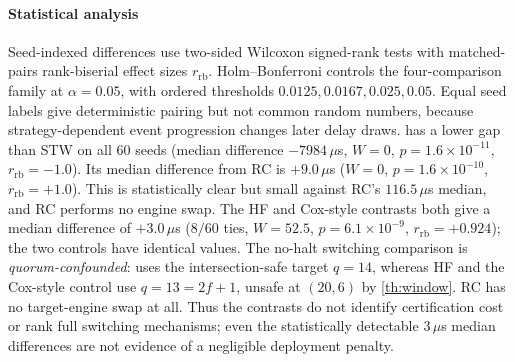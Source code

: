 \begin{table}[t]
\centering
{}
\end{table}

\paragraph{Statistical analysis}
Seed-indexed differences use two-sided Wilcoxon signed-rank tests with matched-pairs rank-biserial
effect sizes $r_{\mathrm{rb}}$. Holm--Bonferroni controls the four-comparison family at $\alpha=0.05$,
with ordered thresholds $0.0125,0.0167,0.025,0.05$. Equal seed labels give deterministic pairing but
not common random numbers, because strategy-dependent event progression changes later delay draws.
\sage{} has a lower gap than STW on all $60$ seeds (median difference $-7984\,\mu$s, $W=0$,
$p=1.6\times10^{-11}$, $r_{\mathrm{rb}}=-1.0$). Its median difference from RC is $+9.0\,\mu$s ($W=0$,
$p=1.6\times10^{-10}$, $r_{\mathrm{rb}}=+1.0$). This is statistically clear but small against RC's
$116.5\,\mu$s median, and RC performs no engine swap. The HF and Cox-style contrasts both
give a median difference of $+3.0\,\mu$s ($8/60$ ties, $W=52.5$, $p=6.1\times10^{-9}$,
$r_{\mathrm{rb}}=+0.924$); the two controls have identical values.
The no-halt switching comparison is \emph{quorum-confounded}: \sage{} uses the
intersection-safe target $q=14$, whereas HF and the Cox-style control use
$q=13=2f+1$, unsafe at $(20,6)$ by \cref{th:window}. RC has no target-engine
swap at all. Thus the contrasts do not identify certification cost or rank
full switching mechanisms; even the statistically detectable $3\,\mu$s
median differences are not evidence of a negligible deployment penalty.

